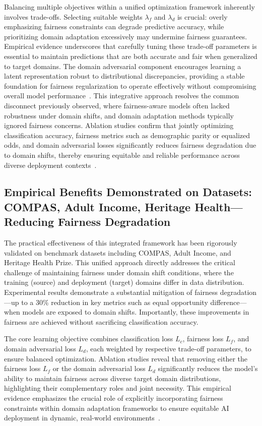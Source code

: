 \documentclass[sigconf]{acmart}
\begin{document}
Balancing multiple objectives within a unified optimization framework inherently involves trade-offs. Selecting suitable weights \(\lambda_f\) and \(\lambda_d\) is crucial: overly emphasizing fairness constraints can degrade predictive accuracy, while prioritizing domain adaptation excessively may undermine fairness guarantees. Empirical evidence underscores that carefully tuning these trade-off parameters is essential to maintain predictions that are both accurate and fair when generalized to target domains. The domain adversarial component encourages learning a latent representation robust to distributional discrepancies, providing a stable foundation for fairness regularization to operate effectively without compromising overall model performance~\cite{ref26}. This integrative approach resolves the common disconnect previously observed, where fairness-aware models often lacked robustness under domain shifts, and domain adaptation methods typically ignored fairness concerns. Ablation studies confirm that jointly optimizing classification accuracy, fairness metrics such as demographic parity or equalized odds, and domain adversarial losses significantly reduces fairness degradation due to domain shifts, thereby ensuring equitable and reliable performance across diverse deployment contexts~\cite{ref26}.

\subsection{Empirical Benefits Demonstrated on Datasets: COMPAS, Adult Income, Heritage Health—Reducing Fairness Degradation}

The practical effectiveness of this integrated framework has been rigorously validated on benchmark datasets including COMPAS, Adult Income, and Heritage Health Prize. This unified approach directly addresses the critical challenge of maintaining fairness under domain shift conditions, where the training (source) and deployment (target) domains differ in data distribution. Experimental results demonstrate a substantial mitigation of fairness degradation—up to a 30\% reduction in key metrics such as equal opportunity difference—when models are exposed to domain shifts. Importantly, these improvements in fairness are achieved without sacrificing classification accuracy.

The core learning objective combines classification loss \(L_c\), fairness loss \(L_f\), and domain adversarial loss \(L_d\), each weighted by respective trade-off parameters, to ensure balanced optimization. Ablation studies reveal that removing either the fairness loss \(L_f\) or the domain adversarial loss \(L_d\) significantly reduces the model’s ability to maintain fairness across diverse target domain distributions, highlighting their complementary roles and joint necessity. This empirical evidence emphasizes the crucial role of explicitly incorporating fairness constraints within domain adaptation frameworks to ensure equitable AI deployment in dynamic, real-world environments~\cite{ref26}.
\end{document}
